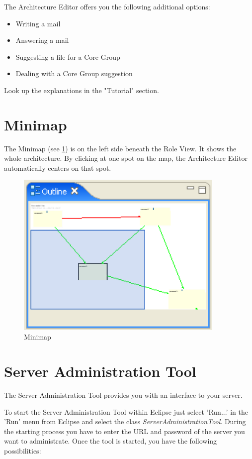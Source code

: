 The Architecture Editor offers you the following additional options:
\begin{itemize}
	\item Writing a mail
	\item Answering a mail
	\item Suggesting a file for a Core Group
	\item Dealing with a Core Group suggestion
\end{itemize}
Look up the explanations in the "Tutorial" section.

\section{Minimap}

The Minimap (see \ref{map}) is on the left side beneath the Role View. It shows the whole architecture.
By clicking at one spot on the map, the Architecture Editor automatically centers on that
spot. 

\begin{figure}[h!]
\begin{center}
\includegraphics[width=10cm]{outline.png}
   \caption{Minimap}
\label{map}
\end{center}
\end{figure}\par


\section{Server Administration Tool}

The Server Administration Tool provides you with an interface to your server. \par
To start the Server Administration Tool within Eclipse just select 'Run...' in the
'Run' menu from Eclipse and select the class
{\it ServerAdministrationTool}.
During the starting process you have to enter the URL and password of the server 
you want to administrate. Once the tool is started, you have the following 
possibilities:

